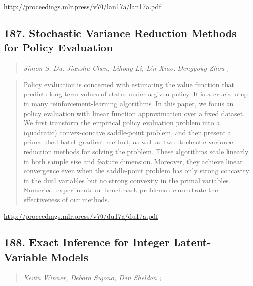 \documentclass{article}
\begin{document}
\href{http://proceedings.mlr.press/v70/lan17a/lan17a.pdf}{http://proceedings.mlr.press/v70/lan17a/lan17a.pdf}

\subsection{187. Stochastic Variance Reduction Methods for Policy Evaluation}

\begin{quote}
\footnotesize{\textit{Simon S. Du, Jianshu Chen, Lihong Li, Lin Xiao, Dengyong Zhou ;}}
\end{quote}

\begin{quote}
    Policy evaluation is concerned with estimating the value function that predicts long-term values of states under a given policy. It is a crucial step in many reinforcement-learning algorithms. In this paper, we focus on policy evaluation with linear function approximation over a fixed dataset. We first transform the empirical policy evaluation problem into a (quadratic) convex-concave saddle-point problem, and then present a primal-dual batch gradient method, as well as two stochastic variance reduction methods for solving the problem. These algorithms scale linearly in both sample size and feature dimension. Moreover, they achieve linear convergence even when the saddle-point problem has only strong concavity in the dual variables but no strong convexity in the primal variables. Numerical experiments on benchmark problems demonstrate the effectiveness of our methods.  \end{quote}

\href{http://proceedings.mlr.press/v70/du17a/du17a.pdf}{http://proceedings.mlr.press/v70/du17a/du17a.pdf}

\subsection{188. Exact Inference for Integer Latent-Variable Models}

\begin{quote}
\footnotesize{\textit{Kevin Winner, Debora Sujono, Dan Sheldon ;}}
\end{quote}
\end{document}
